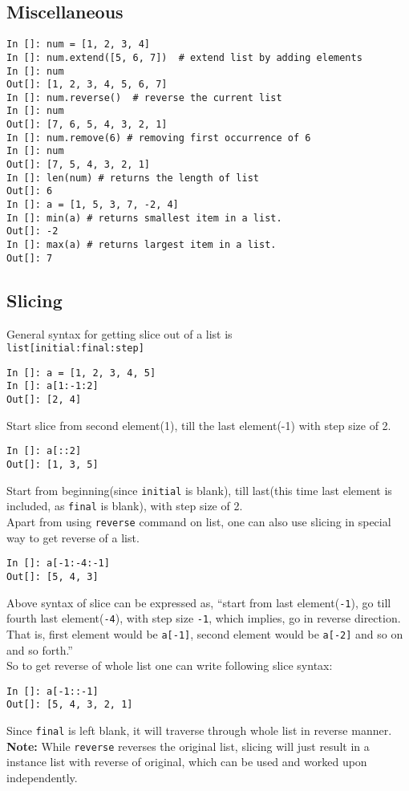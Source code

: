 \documentclass[12pt]{article}
\newcommand{\typ}[1]{\lstinline{#1}}
\begin{document}
\subsection{Miscellaneous}
\begin{lstlisting}
In []: num = [1, 2, 3, 4]
In []: num.extend([5, 6, 7])  # extend list by adding elements
In []: num
Out[]: [1, 2, 3, 4, 5, 6, 7]
In []: num.reverse()  # reverse the current list
In []: num
Out[]: [7, 6, 5, 4, 3, 2, 1]
In []: num.remove(6) # removing first occurrence of 6
In []: num
Out[]: [7, 5, 4, 3, 2, 1]
In []: len(num) # returns the length of list
Out[]: 6
In []: a = [1, 5, 3, 7, -2, 4]
In []: min(a) # returns smallest item in a list.
Out[]: -2
In []: max(a) # returns largest item in a list.
Out[]: 7
\end{lstlisting}

\subsection{Slicing} 
General syntax for getting slice out of a list is \\
\typ{list[initial:final:step]}
\begin{lstlisting}
In []: a = [1, 2, 3, 4, 5]
In []: a[1:-1:2] 
Out[]: [2, 4]
\end{lstlisting}
Start slice from second element(1), till the last element(-1) with step size of 2.
\begin{lstlisting}
In []: a[::2]
Out[]: [1, 3, 5]
\end{lstlisting}
Start from beginning(since \typ{initial} is blank), till last(this time last element is included, as \typ{final} is blank), with step size of 2.\\
Apart from using \typ{reverse} command on list, one can also use slicing in special way to get reverse of a list.
\begin{lstlisting}
In []: a[-1:-4:-1]
Out[]: [5, 4, 3]
\end{lstlisting}
Above syntax of slice can be expressed as, ``start from last element(\typ{-1}), go till fourth last element(\typ{-4}), with step size \typ{-1}, which implies, go in reverse direction. That is, first element would be \typ{a[-1]}, second element would be \typ{a[-2]} and so on and so forth.''\\
So to get reverse of whole list one can write following slice syntax:
\begin{lstlisting}
In []: a[-1::-1]
Out[]: [5, 4, 3, 2, 1]
\end{lstlisting}
Since \typ{final} is left blank, it will traverse through whole list in reverse manner.\\
\textbf{Note:} While \typ{reverse} reverses the original list, slicing will just result in a instance list with reverse of original, which can be used and worked upon independently.
\end{document}
